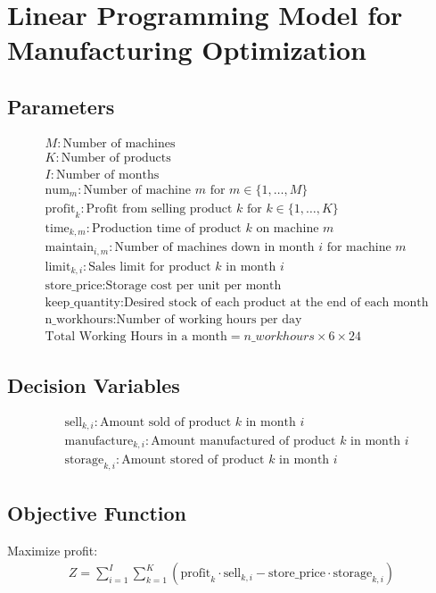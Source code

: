 \documentclass{article}
\begin{document}
\section*{Linear Programming Model for Manufacturing Optimization}

\subsection*{Parameters}
\begin{align*}
& M: \text{Number of machines} \\
& K: \text{Number of products} \\
& I: \text{Number of months} \\
& \text{num}_{m}: \text{Number of machine } m \text{ for } m \in \{1, \ldots, M\} \\
& \text{profit}_{k}: \text{Profit from selling product } k \text{ for } k \in \{1, \ldots, K\} \\
& \text{time}_{k, m}: \text{Production time of product } k \text{ on machine } m \\
& \text{maintain}_{i, m}: \text{Number of machines down in month } i \text{ for machine } m \\
& \text{limit}_{k, i}: \text{Sales limit for product } k \text{ in month } i \\
& \text{store\_price}: \text{Storage cost per unit per month} \\
& \text{keep\_quantity}: \text{Desired stock of each product at the end of each month} \\
& \text{n\_workhours}: \text{Number of working hours per day} \\
& \text{Total Working Hours in a month} = n\_workhours \times 6 \times 24
\end{align*}

\subsection*{Decision Variables}
\begin{align*}
& \text{sell}_{k, i}: \text{Amount sold of product } k \text{ in month } i \\
& \text{manufacture}_{k, i}: \text{Amount manufactured of product } k \text{ in month } i \\
& \text{storage}_{k, i}: \text{Amount stored of product } k \text{ in month } i
\end{align*}

\subsection*{Objective Function}
Maximize profit:
\begin{align*}
Z = \sum_{i=1}^{I} \sum_{k=1}^{K} \left( \text{profit}_{k} \cdot \text{sell}_{k, i} - \text{store\_price} \cdot \text{storage}_{k, i} \right)
\end{align*}
\end{document}
